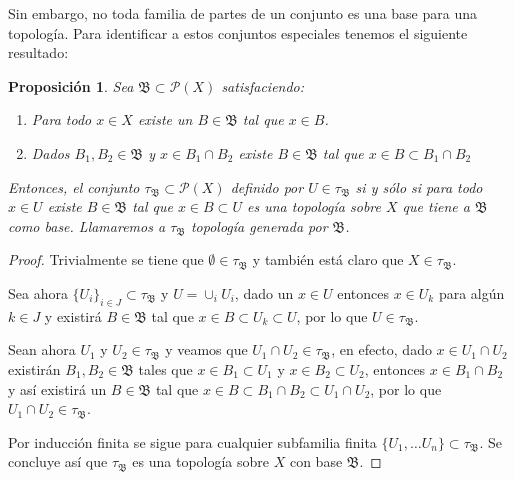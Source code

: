 \documentclass[12pt]{article}
\newtheorem{proposition}[theorem]{Proposición}
\begin{document}
Sin embargo, no toda familia de partes de un conjunto es una base para una topología. Para identificar a estos conjuntos especiales tenemos el siguiente resultado:

\begin{proposition}Sea $\mathfrak{B} \subset \mathcal{P}(X)$ satisfaciendo: 
\begin{enumerate}
\item Para todo $x \in X$ existe un $B \in \mathfrak{B}$ tal que $x \in B$.
\item Dados $B_1, B_2 \in \mathfrak{B}$ y $x \in B_1 \cap B_2$ existe $B \in \mathfrak{B}$ tal que $x \in B \subset B_1 \cap B_2$
\end{enumerate}
Entonces, el conjunto $\tau_{\mathfrak{B}} \subset \mathcal{P}(X)$ definido por $U \in \tau_{\mathfrak{B}}$ si y sólo si para todo $x \in U$ existe $B \in \mathfrak{B}$ tal que $x \in B \subset U$ es una topología sobre $X$ que tiene a $\mathfrak{B}$ como base. Llamaremos a $\tau_{\mathfrak{B}}$ topología generada por $\mathfrak{B}$.
\end{proposition}
\begin{proof}Trivialmente se tiene que $\emptyset \in \tau_{\mathfrak{B}}$ y también está claro que $X \in \tau_{\mathfrak{B}}$. 

Sea ahora $\lbrace U_i\rbrace_{i\in J} \subset \tau_{\mathfrak{B}}$ y $U = \cup_i U_i$, dado un $x \in U$ entonces $x \in U_k$ para algún $k \in J$ y existirá $B \in \mathfrak{B}$ tal que $x \in B \subset U_k \subset U$, por lo que $U \in \tau_{\mathfrak{B}}$. 

Sean ahora $U_1$ y $U_2 \in \tau_{\mathfrak{B}}$ y veamos que $U_1 \cap U_2 \in \tau_{\mathfrak{B}}$, en efecto, dado $x \in U_1 \cap U_2$ existirán $B_1, B_2 \in \mathfrak{B}$ tales que $x \in B_1 \subset U_1$ y $x \in B_2 \subset U_2$, entonces $x \in B_1 \cap B_2$ y así existirá un $B \in \mathfrak{B}$ tal que $x \in B \subset B_1 \cap B_2 \subset U_1 \cap U_2$, por lo que $U_1 \cap U_2 \in \tau_{\mathfrak{B}}$. 

Por inducción finita se sigue para cualquier subfamilia finita $\lbrace U_1, \ldots U_n \rbrace \subset \tau_{\mathfrak{B}}$. Se concluye así que $\tau_{\mathfrak{B}}$ es una topología sobre $X$ con base $\mathfrak{B}$.

\end{proof}
\end{document}
